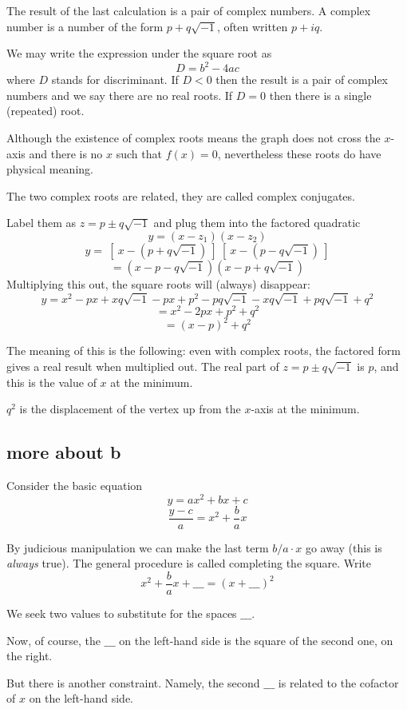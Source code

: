 \documentclass[11pt, oneside]{article}
\begin{document}
The result of the last calculation is a pair of complex numbers.  A complex number is a number of the form $p + q \sqrt{-1}$, often written $p + iq$.

We may write the expression under the square root as
\[ D = b^2 - 4ac \]
where $D$ stands for discriminant.  If $D < 0$ then the result is a pair of complex numbers and we say there are no real roots.  If $D = 0$ then there is a single (repeated) root.

Although the existence of complex roots means the graph does not cross the $x$-axis and there is no $x$ such that $f(x) = 0$, nevertheless these roots do have physical meaning.  

The two complex roots are related, they are called complex conjugates.  

Label them as $z = p \pm q \sqrt{-1}$ and plug them into the factored quadratic
\[ y = (x - z_1)(x - z_2) \]
\[ y = \ [ \ x - (p + q \sqrt{-1} ) \ ] \ [ \ x - (p - q \sqrt{-1} ) \ ] \]
\[ = (x - p - q \sqrt{-1})(x - p + q \sqrt{-1}) \]
Multiplying this out, the square roots will (always) disappear:
\[ y = x^2 - px + xq \sqrt{-1} - px + p^2 - pq \sqrt{-1} - xq \sqrt{-1} + pq \sqrt{-1} + q^2 \]
\[ = x^2 - 2px + p^2 + q^2 \]
\[ = (x - p)^2 + q^2 \]

The meaning of this is the following:  even with complex roots, the factored form gives a real result when multiplied out.  The real part of $z = p \pm q \sqrt{-1}$ is $p$, and this is the value of $x$ at the minimum.  

$q^2$ is the displacement of the vertex up from the $x$-axis at the minimum.

\subsection*{more about b}
Consider the basic equation
\[ y = ax^2 + bx + c \]
\[ \frac{y - c}{a} = x^2 + \frac{b}{a} x \]

By judicious manipulation we can make the last term $b/a \cdot x$ go away (this is  \emph{always} true).  The general procedure is called completing the square.  Write
\[ x^2 + \frac{b}{a} x + \_\_\_ = (x +  \_\_\_)^2 \]

We seek two values to substitute for the spaces $ \_\_\_$.  

Now, of course, the $\_\_\_$ on the left-hand side is the square of the second one, on the right.  

But there is another constraint.  Namely, the second $\_\_\_$ is related to the cofactor of $x$ on the left-hand side.
\end{document}
